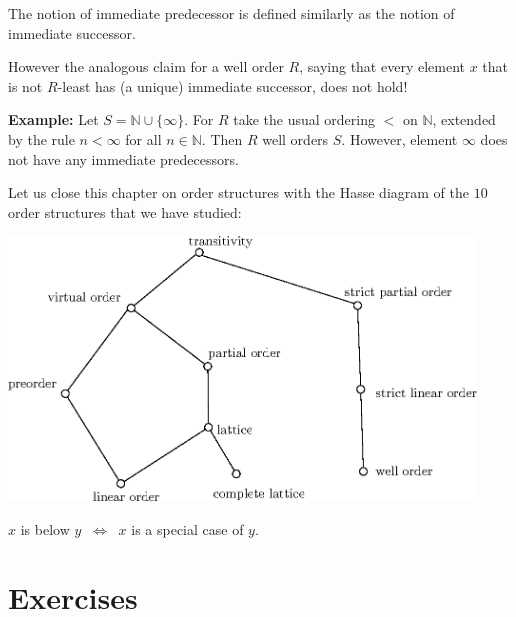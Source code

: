 \documentclass[11pt,paper=b5,footinclude,headinclude]{scrbook} %
\def\cee {{~\Leftrightarrow~}}
\theoremstyle{remark}
\theoremstyle{definition} %
\theoremstyle{theorem} %
\begin{document}
The notion of immediate predecessor is defined similarly as the
notion of immediate successor.

However the analogous claim for a well order $R$, saying that every element $x$ that is not $R$-least has (a unique) immediate successor, does not hold!

\bigskip
\textbf{ Example:}
Let $S = \mathbb{N}\cup\{\infty\}$. For $R$ take the usual ordering $<$ on $\mathbb{N}$, extended by the rule $n<\infty$ for all $n\in \mathbb{N}$.
Then $R$ well orders $S$. However, element $\infty$ does not have any immediate predecessors.

\medskip

Let us close this chapter on order structures with the Hasse diagram of the $10$ order structures that we have studied:

\begin{center}
\includegraphics[height=70mm]{strukture3-en.eps}
\end{center}

$x$ is below $y$ $\cee$ $x$ is a special case of $y$.

\section{Exercises}
\end{document}
